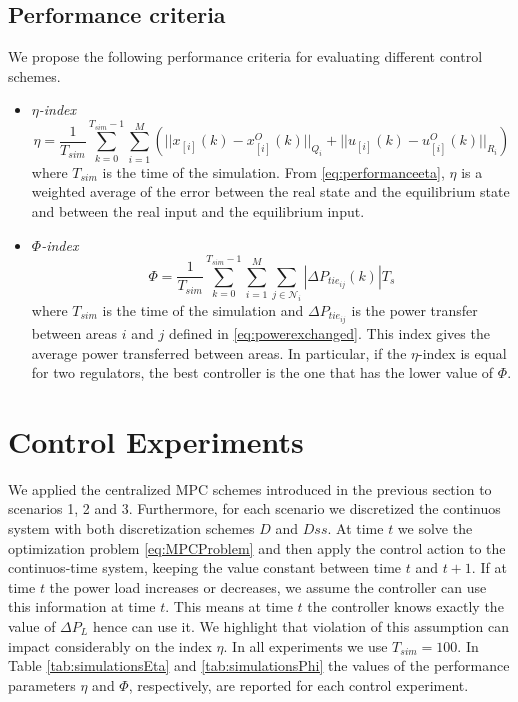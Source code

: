 \documentclass[a4paper]{article}
\newcommand{\NN}{{\mathcal N}}
\newcommand{\subss}[2]{#1_{[#2]}}
\newcommand{\abs}[1]{{|{#1}|}}
\newcommand{\norme}[2]{{||{#1}||_{#2}}}
\begin{document}
          \subsection{Performance criteria}
               We propose the following performance criteria for evaluating different control schemes.
               \begin{itemize}
               \item\emph{$\eta$-index}
                 \begin{equation}
                   \label{eq:performanceeta}
                   \eta = \frac{1}{T_{sim}}\sum_{k=0}^{T_{sim}-1}\sum_{i=1}^M (\norme{\subss x i(k)-\subss x i^O(k)}{Q_i}+\norme{\subss u i(k)-\subss u i^O(k)}{R_i})
                 \end{equation}
                 where $T_{sim}$ is the time of the simulation. From \eqref{eq:performanceeta}, $\eta$ is a weighted average of the error between the real state and the equilibrium state and between the real input and the equilibrium input.
               \item \emph{$\Phi$-index}
                 \begin{equation}
                   \label{eq:performancePhi}
                   \Phi = \frac{1}{T_{sim}}\sum_{k=0}^{T_{sim}-1}\sum_{i=1}^M\sum_{j\in\NN_i}\abs{\Delta P_{{tie}_{ij}}(k)}T_s
                 \end{equation}
                 where $T_{sim}$ is the time of the simulation and $\Delta P_{{tie}_{ij}}$ is the power transfer between areas $i$ and $j$ defined in \eqref{eq:powerexchanged}. This index gives the average power transferred between areas. In particular, if the $\eta$-index is equal for two regulators, the best controller is the one that has the lower value of $\Phi$.
               \end{itemize}
               


     \section{Control Experiments}
          We applied the centralized MPC schemes introduced in the previous section to scenarios 1, 2 and 3. Furthermore, for each scenario we discretized the continuos system with both discretization schemes $D$ and $Dss$. At time $t$ we solve the optimization problem \eqref{eq:MPCProblem} and then apply the control action to the continuos-time system, keeping the value constant between time $t$ and $t+1$. If at time $t$ the power load increases or decreases, we assume the controller can use this information at time $t$. This means at time $t$ the controller knows exactly the value of $\Delta P_L$ hence can use it. We highlight that violation of this assumption can impact considerably on the index $\eta$. In all experiments we use $T_{sim}=100$. In Table \ref{tab:simulationsEta} and \ref{tab:simulationsPhi} the values of the performance parameters $\eta$ and $\Phi$, respectively, are reported for each control experiment. 
\end{document}
